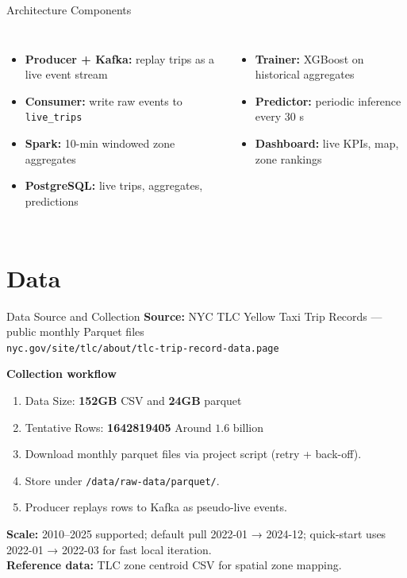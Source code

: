 \documentclass[aspectratio=169,professionalfonts]{beamer}
\begin{document}
\begin{frame}{Architecture Components}
\begin{columns}[T]
\begin{itemize}
  \item \textbf{Producer + Kafka:} replay trips as a live event stream
  \item \textbf{Consumer:} write raw events to \texttt{live\_trips}
  \item \textbf{Spark:} 10-min windowed zone aggregates
  \item \textbf{PostgreSQL:} live trips, aggregates, predictions
\end{itemize}

\begin{itemize}
  \item \textbf{Trainer:} XGBoost on historical aggregates
  \item \textbf{Predictor:} periodic inference every 30 s
  \item \textbf{Dashboard:} live KPIs, map, zone rankings
\end{itemize}
\vspace{0.5em}
\end{columns}
\end{frame}

%
\section{Data}

\begin{frame}{Data Source and Collection}
\textbf{Source:} NYC TLC Yellow Taxi Trip Records — public monthly Parquet files\\
\small\texttt{nyc.gov/site/tlc/about/tlc-trip-record-data.page}\normalsize

\vspace{0.5em}
\textbf{Collection workflow}
\begin{enumerate}
  \item Data Size:  \textbf{152GB} CSV and \textbf{24GB} parquet
  \item Tentative Rows: \textbf{1642819405} \-  Around $1.6$ billion
  \item Download monthly parquet files via project script (retry + back-off).
  \item Store under \texttt{/data/raw-data/parquet/}.
  \item Producer replays rows to Kafka as pseudo-live events.
\end{enumerate}

\vspace{0.5em}
\textbf{Scale:} 2010--2025 supported; default pull 2022-01 → 2024-12;
quick-start uses 2022-01 → 2022-03 for fast local iteration.\\[0.4em]
\textbf{Reference data:} TLC zone centroid CSV for spatial zone mapping.
\end{frame}
\end{document}
